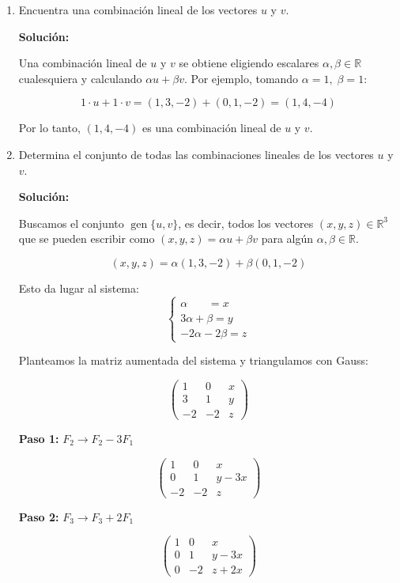 \documentclass[12pt]{article}
\newcommand{\solucion}{%
    \vspace{0.8em}%
    \textbf{Solución:}%
    \vspace{0.8em}%
}
\begin{document}
\begin{enumerate}[label=\alph*.-]
    \item Encuentra una combinación lineal de los vectores $u$ y $v$.

    \solucion

    Una combinación lineal de $u$ y $v$ se obtiene eligiendo escalares $\alpha,\beta \in \mathbb{R}$ cualesquiera y calculando $\alpha u+\beta v$. Por ejemplo, tomando $\alpha=1,\; \beta=1$:

    \[
    1\cdot u + 1\cdot v = (1,3,-2)+(0,1,-2) = (1,4,-4)
    \]

    Por lo tanto, $(1,4,-4)$ es una combinación lineal de $u$ y $v$.

    \item Determina el conjunto de todas las combinaciones lineales de los vectores $u$ y $v$.

    \solucion

    Buscamos el conjunto $\operatorname{gen}\{u,v\}$, es decir, todos los vectores $(x,y,z) \in \mathbb{R}^3$ que se pueden escribir como $(x,y,z)=\alpha u+\beta v$ para algún $\alpha,\beta\in\mathbb{R}$.

    \[
    (x,y,z) = \alpha(1,3,-2)+\beta(0,1,-2)
    \]

    Esto da lugar al sistema:
    \[
    \begin{cases}
    \alpha \phantom{+2\beta} = x \\
    3\alpha+\beta = y \\
    -2\alpha-2\beta = z
    \end{cases}
    \]

    Planteamos la matriz aumentada del sistema y triangulamos con Gauss:

    \[
    \left(\begin{array}{cc|c}
    1 & 0 & x \\
    3 & 1 & y \\
    -2 & -2 & z
    \end{array}\right)
    \]

    \textbf{Paso 1:} $F_2 \to F_2 - 3F_1$

    \[
    \left(\begin{array}{cc|c}
    1 & 0 & x \\
    0 & 1 & y-3x \\
    -2 & -2 & z
    \end{array}\right)
    \]

    \textbf{Paso 2:} $F_3 \to F_3 + 2F_1$

    \[
    \left(\begin{array}{cc|c}
    1 & 0 & x \\
    0 & 1 & y-3x \\
    0 & -2 & z+2x
    \end{array}\right)
    \]


\end{enumerate}
\end{document}
